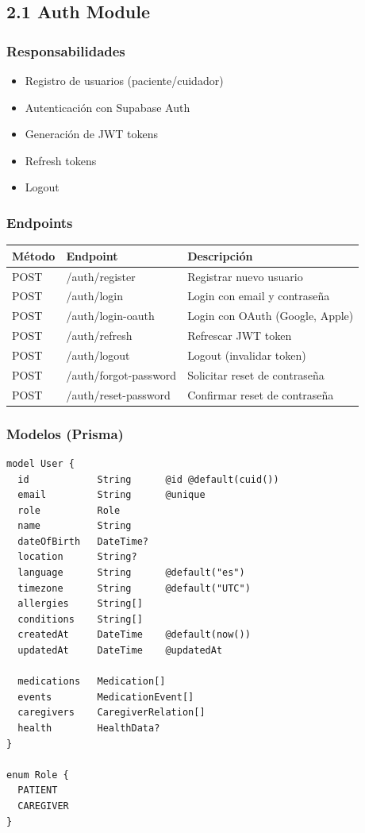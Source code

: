\documentclass[12pt,a4paper]{article}
\begin{document}
\subsection{2.1 Auth Module}

\subsubsection{Responsabilidades}
\begin{itemize}
    \item Registro de usuarios (paciente/cuidador)
    \item Autenticación con Supabase Auth
    \item Generación de JWT tokens
    \item Refresh tokens
    \item Logout
\end{itemize}

\subsubsection{Endpoints}

\begin{center}
\begin{tabular}{|l|l|l|}
\hline
\rowcolor{lightblue}
\textbf{Método} & \textbf{Endpoint} & \textbf{Descripción} \\
\hline
POST & /auth/register & Registrar nuevo usuario \\
\hline
POST & /auth/login & Login con email y contraseña \\
\hline
POST & /auth/login-oauth & Login con OAuth (Google, Apple) \\
\hline
POST & /auth/refresh & Refrescar JWT token \\
\hline
POST & /auth/logout & Logout (invalidar token) \\
\hline
POST & /auth/forgot-password & Solicitar reset de contraseña \\
\hline
POST & /auth/reset-password & Confirmar reset de contraseña \\
\hline
\end{tabular}
\end{center}

\subsubsection{Modelos (Prisma)}

\begin{verbatim}
model User {
  id            String      @id @default(cuid())
  email         String      @unique
  role          Role
  name          String
  dateOfBirth   DateTime?
  location      String?
  language      String      @default("es")
  timezone      String      @default("UTC")
  allergies     String[]
  conditions    String[]
  createdAt     DateTime    @default(now())
  updatedAt     DateTime    @updatedAt
  
  medications   Medication[]
  events        MedicationEvent[]
  caregivers    CaregiverRelation[]
  health        HealthData?
}

enum Role {
  PATIENT
  CAREGIVER
}
\end{verbatim}
\end{document}
